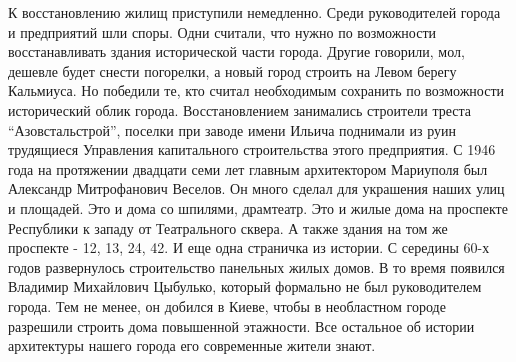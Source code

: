 
К восстановлению жилищ приступили немедленно. Среди руководителей города и
предприятий шли споры. Одни считали, что нужно по возможности восстанавливать
здания исторической части города. Другие говорили, мол, дешевле будет снести
погорелки, а новый город строить на Левом берегу Кальмиуса. Но победили те, кто
считал необходимым сохранить по возможности исторический облик города.
Восстановлением занимались строители треста \enquote{Азовстальстрой}, поселки при
заводе имени Ильича поднимали из руин трудящиеся Управления капитального
строительства этого предприятия. С 1946 года на протяжении двадцати семи лет
главным архитектором Мариуполя был Александр Митрофанович Веселов. Он много
сделал для украшения наших улиц и площадей. Это и дома со шпилями, драмтеатр.
Это и жилые дома на проспекте Республики к западу от Театрального сквера. А
также здания на том же проспекте - 12, 13, 24, 42. И еще одна страничка из
истории. С середины 60-х годов развернулось строительство панельных жилых
домов. В то время появился Владимир Михайлович Цыбулько, который формально не
был руководителем города. Тем не менее, он добился в Киеве, чтобы в необластном
городе разрешили строить дома повышенной этажности. Все остальное об истории
архитектуры нашего города его современные жители знают.
